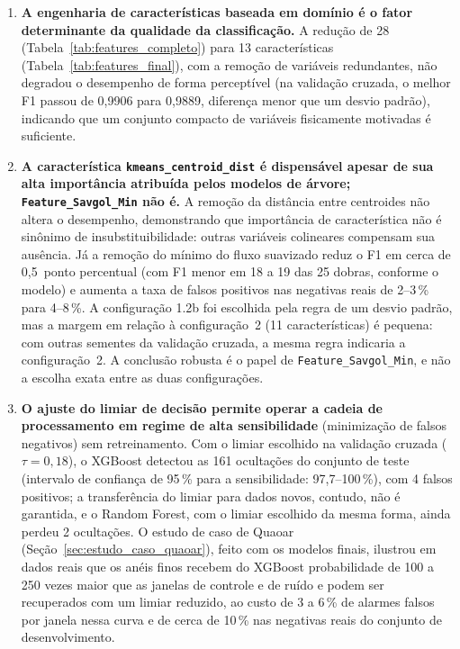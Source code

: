 \begin{enumerate}
	\item \textbf{A engenharia de características baseada em domínio é o fator determinante da qualidade da classificação.} A redução de 28 (Tabela~\ref{tab:features_completo}) para 13 características (Tabela~\ref{tab:features_final}), com a remoção de variáveis redundantes, não degradou o desempenho de forma perceptível (na validação cruzada, o melhor F1 passou de 0,9906 para 0,9889, diferença menor que um desvio padrão), indicando que um conjunto compacto de variáveis fisicamente motivadas é suficiente.

	\item \textbf{A característica \texttt{kmeans\_centroid\_dist} é dispensável apesar de sua alta importância atribuída pelos modelos de árvore; \texttt{Feature\_Savgol\_Min} não é.} A remoção da distância entre centroides não altera o desempenho, demonstrando que importância de característica não é sinônimo de insubstituibilidade: outras variáveis colineares compensam sua ausência. Já a remoção do mínimo do fluxo suavizado reduz o F1 em cerca de 0,5~ponto percentual (com F1 menor em 18 a 19 das 25 dobras, conforme o modelo) e aumenta a taxa de falsos positivos nas negativas reais de 2--3\,\% para 4--8\,\%. A configuração 1.2b foi escolhida pela regra de um desvio padrão, mas a margem em relação à configuração~2 (11 características) é pequena: com outras sementes da validação cruzada, a mesma regra indicaria a configuração~2. A conclusão robusta é o papel de \texttt{Feature\_Savgol\_Min}, e não a escolha exata entre as duas configurações.

	\item \textbf{O ajuste do limiar de decisão permite operar a cadeia de processamento em regime de alta sensibilidade} (minimização de falsos negativos) sem retreinamento. Com o limiar escolhido na validação cruzada ($\tau = 0{,}18$), o XGBoost detectou as 161 ocultações do conjunto de teste (intervalo de confiança de 95\,\% para a sensibilidade: 97,7--100\,\%), com 4 falsos positivos; a transferência do limiar para dados novos, contudo, não é garantida, e o Random Forest, com o limiar escolhido da mesma forma, ainda perdeu 2 ocultações. O estudo de caso de Quaoar (Seção~\ref{sec:estudo_caso_quaoar}), feito com os modelos finais, ilustrou em dados reais que os anéis finos recebem do XGBoost probabilidade de 100 a 250 vezes maior que as janelas de controle e de ruído e podem ser recuperados com um limiar reduzido, ao custo de 3 a 6\,\% de alarmes falsos por janela nessa curva e de cerca de 10\,\% nas negativas reais do conjunto de desenvolvimento.
\end{enumerate}

